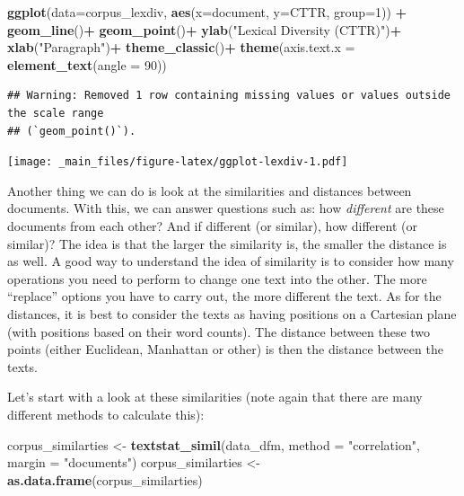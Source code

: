 \documentclass[
]{book}
\newenvironment{Shaded}{\begin{snugshade}}{\end{snugshade}}
\newcommand{\AttributeTok}[1]{\textcolor[rgb]{0.13,0.29,0.53}{#1}}
\newcommand{\DecValTok}[1]{\textcolor[rgb]{0.00,0.00,0.81}{#1}}
\newcommand{\FunctionTok}[1]{\textcolor[rgb]{0.13,0.29,0.53}{\textbf{#1}}}
\newcommand{\NormalTok}[1]{#1}
\newcommand{\OtherTok}[1]{\textcolor[rgb]{0.56,0.35,0.01}{#1}}
\newcommand{\SpecialCharTok}[1]{\textcolor[rgb]{0.81,0.36,0.00}{\textbf{#1}}}
\newcommand{\StringTok}[1]{\textcolor[rgb]{0.31,0.60,0.02}{#1}}
\begin{document}
\begin{Shaded}
\begin{Highlighting}[]
\FunctionTok{ggplot}\NormalTok{(}\AttributeTok{data=}\NormalTok{corpus\_lexdiv, }\FunctionTok{aes}\NormalTok{(}\AttributeTok{x=}\NormalTok{document, }\AttributeTok{y=}\NormalTok{CTTR, }\AttributeTok{group=}\DecValTok{1}\NormalTok{)) }\SpecialCharTok{+}
 \FunctionTok{geom\_line}\NormalTok{()}\SpecialCharTok{+}
 \FunctionTok{geom\_point}\NormalTok{()}\SpecialCharTok{+}
 \FunctionTok{ylab}\NormalTok{(}\StringTok{"Lexical Diversity (CTTR)"}\NormalTok{)}\SpecialCharTok{+}
 \FunctionTok{xlab}\NormalTok{(}\StringTok{"Paragraph"}\NormalTok{)}\SpecialCharTok{+}
 \FunctionTok{theme\_classic}\NormalTok{()}\SpecialCharTok{+}
 \FunctionTok{theme}\NormalTok{(}\AttributeTok{axis.text.x =} \FunctionTok{element\_text}\NormalTok{(}\AttributeTok{angle =} \DecValTok{90}\NormalTok{))}
\end{Highlighting}
\end{Shaded}

\begin{verbatim}
## Warning: Removed 1 row containing missing values or values outside the scale range
## (`geom_point()`).
\end{verbatim}

\texttt{[image: \_main\_files/figure-latex/ggplot-lexdiv-1.pdf]}

Another thing we can do is look at the similarities and distances between documents. With this, we can answer questions such as: how \emph{different} are these documents from each other? And if different (or similar), how different (or similar)? The idea is that the larger the similarity is, the smaller the distance is as well. A good way to understand the idea of similarity is to consider how many operations you need to perform to change one text into the other. The more ``replace'' options you have to carry out, the more different the text. As for the distances, it is best to consider the texts as having positions on a Cartesian plane (with positions based on their word counts). The distance between these two points (either Euclidean, Manhattan or other) is then the distance between the texts.

Let's start with a look at these similarities (note again that there are many different methods to calculate this):

\begin{Shaded}
\begin{Highlighting}[]
\NormalTok{corpus\_similarties }\OtherTok{\textless{}{-}} \FunctionTok{textstat\_simil}\NormalTok{(data\_dfm, }\AttributeTok{method =} \StringTok{"correlation"}\NormalTok{, }\AttributeTok{margin =} \StringTok{"documents"}\NormalTok{)}
\NormalTok{corpus\_similarties }\OtherTok{\textless{}{-}} \FunctionTok{as.data.frame}\NormalTok{(corpus\_similarties)}
\end{Highlighting}
\end{Shaded}
\end{document}
